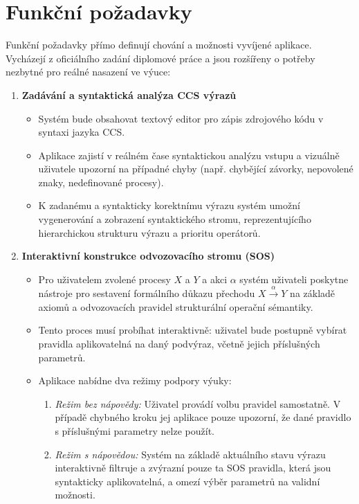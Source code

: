 \section{Funkční požadavky}
\label{sec:funkcni_pozadavky}
Funkční požadavky přímo definují chování a možnosti vyvíjené aplikace. Vycházejí z oficiálního zadání diplomové práce a jsou rozšířeny o potřeby nezbytné pro reálné nasazení ve výuce:

\begin{enumerate}
    \item \textbf{Zadávání a syntaktická analýza CCS výrazů}
    \begin{itemize}
        \item Systém bude obsahovat textový editor pro zápis zdrojového kódu v syntaxi jazyka CCS.
        \item Aplikace zajistí v reálném čase syntaktickou analýzu vstupu a vizuálně uživatele upozorní na případné chyby (např. chybějící závorky, nepovolené znaky, nedefinované procesy).
        \item K zadanému a syntakticky korektnímu výrazu systém umožní vygenerování a zobrazení syntaktického stromu, reprezentujícího hierarchickou strukturu výrazu a prioritu operátorů.
    \end{itemize}
    
    \item \textbf{Interaktivní konstrukce odvozovacího stromu (SOS)}
    \begin{itemize}
        \item Pro uživatelem zvolené procesy $X$ a $Y$ a akci $\alpha$ systém uživateli poskytne nástroje pro sestavení formálního důkazu přechodu $X \xrightarrow{\alpha} Y$ na základě axiomů a odvozovacích pravidel strukturální operační sémantiky.
        \item Tento proces musí probíhat interaktivně: uživatel bude postupně vybírat pravidla aplikovatelná na daný podvýraz, včetně jejich příslušných parametrů.
        \item Aplikace nabídne dva režimy podpory výuky:
        \begin{enumerate}
            \item \textit{Režim bez nápovědy:} Uživatel provádí volbu pravidel samostatně. V případě chybného kroku jej aplikace pouze upozorní, že dané pravidlo s příslušnými parametry nelze použít.
            \item \textit{Režim s nápovědou:} Systém na základě aktuálního stavu výrazu interaktivně filtruje a zvýrazní pouze ta SOS pravidla, která jsou syntakticky aplikovatelná, a omezí výběr parametrů na validní možnosti.
        \end{enumerate}
    \end{itemize}
    

\end{enumerate}
